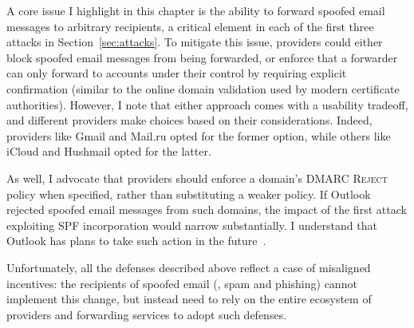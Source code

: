 A core issue I highlight in this chapter is the ability to forward spoofed email messages to arbitrary recipients, a critical element in each
of the first three attacks in Section~\ref{sec:attacks}. To mitigate this issue, providers could either block spoofed email messages from being forwarded, or enforce that a forwarder can only forward to accounts under their control by requiring explicit confirmation (similar to
the online domain validation used by modern certificate authorities). However, I note that either approach comes with a usability tradeoff, and different providers make choices based on their considerations. Indeed, providers like Gmail and Mail.ru opted for the former option, while others like iCloud and Hushmail opted for the latter.







As well, I advocate that providers
should enforce a domain's DMARC \textsc{Reject} policy when specified, rather
than substituting a weaker policy.  If Outlook rejected spoofed
email messages from such domains, the impact of the first attack
exploiting SPF incorporation
would
narrow substantially. I understand that Outlook has plans to take such action in the future~\cite{hotmailreject}.


Unfortunately, all the defenses described above reflect a
case of misaligned
incentives: the recipients of spoofed email (\eg, spam and phishing)
cannot implement this change, but instead need to rely on the entire
ecosystem of providers and forwarding services to adopt such defenses. 

